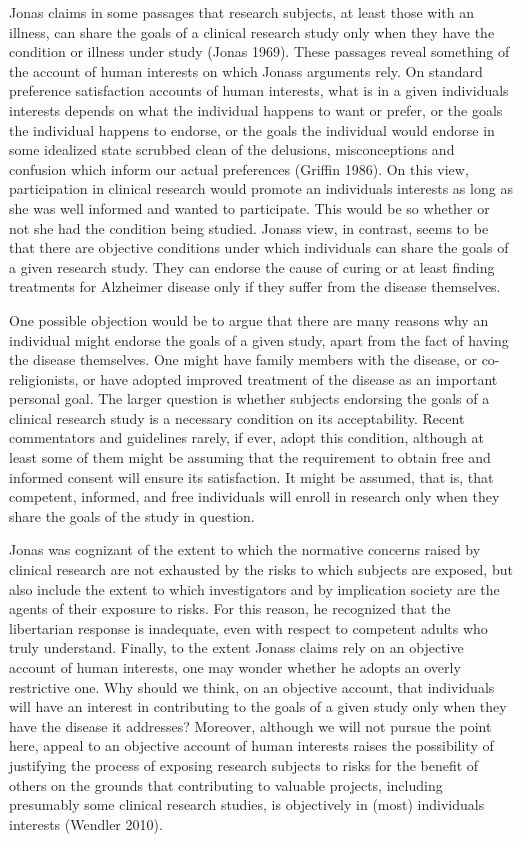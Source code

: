 \documentclass[12p]{article}
\begin{document}
Jonas claims in some passages that research subjects, at least those with an illness, can share the goals of a clinical research study only when they have the condition or illness under study (Jonas 1969). These passages reveal something of the account of human interests on which Jonass arguments rely. On standard preference satisfaction accounts of human interests, what is in a given individuals interests depends on what the individual happens to want or prefer, or the goals the individual happens to endorse, or the goals the individual would endorse in some idealized state scrubbed clean of the delusions, misconceptions and confusion which inform our actual preferences (Griffin 1986). On this view, participation in clinical research would promote an individuals interests as long as she was well informed and wanted to participate. This would be so whether or not she had the condition being studied. Jonass view, in contrast, seems to be that there are objective conditions under which individuals can share the goals of a given research study. They can endorse the cause of curing or at least finding treatments for Alzheimer disease only if they suffer from the disease themselves.

One possible objection would be to argue that there are many reasons why an individual might endorse the goals of a given study, apart from the fact of having the disease themselves. One might have family members with the disease, or co-religionists, or have adopted improved treatment of the disease as an important personal goal. The larger question is whether subjects endorsing the goals of a clinical research study is a necessary condition on its acceptability. Recent commentators and guidelines rarely, if ever, adopt this condition, although at least some of them might be assuming that the requirement to obtain free and informed consent will ensure its satisfaction. It might be assumed, that is, that competent, informed, and free individuals will enroll in research only when they share the goals of the study in question.

Jonas was cognizant of the extent to which the normative concerns raised by clinical research are not exhausted by the risks to which subjects are exposed, but also include the extent to which investigators and by implication society are the agents of their exposure to risks. For this reason, he recognized that the libertarian response is inadequate, even with respect to competent adults who truly understand. Finally, to the extent Jonass claims rely on an objective account of human interests, one may wonder whether he adopts an overly restrictive one. Why should we think, on an objective account, that individuals will have an interest in contributing to the goals of a given study only when they have the disease it addresses? Moreover, although we will not pursue the point here, appeal to an objective account of human interests raises the possibility of justifying the process of exposing research subjects to risks for the benefit of others on the grounds that contributing to valuable projects, including presumably some clinical research studies, is objectively in (most) individuals interests (Wendler 2010).
\end{document}
